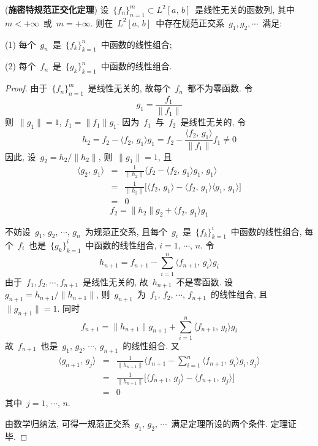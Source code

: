 
\begin{Theorem}(\textbf{施密特规范正交化定理})
设~$\{f_{n}\}_{n=1}^{m}\subset L^2[a,\,b]$~是线性无关的函数列, 其中~$m<+\infty$~或~$m=+\infty$.
则在~$L^2[a,\,b]$~中存在规范正交系~$g_{1}, g_{2}, \cdots$~满足:


(1) 每个~$g_{n}$~是~$\{f_{k}\}_{k=1}^{n}$~中函数的线性组合;

(2)  每个~$f_{n}$~是~$\{g_{k}\}_{k=1}^{n}$~中函数的线性组合.
\end{Theorem}

\begin{proof}
由于~$\{f_{n}\}_{n=1}^{m}$~是线性无关的, 故每个~$f_{n}$~都不为零函数. 令
\[
g_{1}=\frac{f_{1}}{\|f_{1}\|}
\]
则~$\|g_{1}\|=1$, $f_{1}=\|f_{1}\|g_{1}$. 因为~$f_{1}$~与~$f_{2}$~是线性无关的, 令
\[
h_{2}=f_{2}-\langle f_{2},\,g_{1}\rangle g_{1}=f_{2}-\frac{\langle f_{2},\,g_{1}\rangle}{\|f_{1}\|}f_{1}\neq 0
\]
因此, 设~$g_{2}=h_{2}/\|h_{2}\|$, 则~$\|g_{1}\|=1$, 且
\begin{eqnarray*}
\langle g_{2},\,g_{1}\rangle &=& \frac{1}{\|h_{2}\|}\big\langle f_{2}-\langle f_{2},\,g_{1}\rangle g_{1},\,g_{1} \big\rangle\\
&=& \frac{1}{\|h_{2}\|}\big[\langle f_{2},\,g_{1}\rangle-\langle f_{2},\,g_{1}\rangle \langle g_{1},\,g_{1}\rangle\big]\\
&=& 0
\end{eqnarray*}
\[
f_{2}=\|h_{2}\|g_{2}+\langle f_{2},\,g_{1}\rangle g_{1}
\]

不妨设~$g_{1},\, g_{2},\, \cdots,\, g_{n}$~为规范正交系, 且每个~$g_{i}$~是~$\{f_{k}\}_{k=1}^{i}$~中函数的线性组合, 每个~$f_{i}$~也是~$\{g_{k}\}_{k=1}^{i}$~中函数的线性组合, $i=1,\,\cdots,\,n$. 令
\[
h_{n+1}=f_{n+1}-\sum_{i=1}^{n}\langle f_{n+1},\,g_{i}\rangle g_{i}
\]
由于~$f_{1}, f_{2}, \cdots, f_{n+1}$~是线性无关的, 故~$h_{n+1}$~不是零函数. 设~$g_{n+1}=h_{n+1}/\|h_{n+1}\|$, 则~$g_{n+1}$~为~$f_{1},\, f_{2},\,\cdots,\, f_{n+1}$~的线性组合, 且~$\|g_{n+1}\|=1$. 同时
\[
f_{n+1}=\|h_{n+1}\|g_{n+1}+\sum_{i=1}^{n} \langle f_{n+1},\,g_{i}\rangle g_{i}
\]
故~$f_{n+1}$~也是~$g_{1},\, g_{2},\, \cdots,\, g_{n+1}$~的线性组合. 又
\begin{eqnarray*}
\langle g_{n+1},\,g_{j}\rangle &=& \frac{1}{\|h_{n+1}\|}\Big\langle f_{n+1}-\sum_{i=1}^{n}\langle f_{n+1},\,g_{i}\rangle g_{i},g_{j} \Big\rangle \\
&=& \frac{1}{\|h_{n+1}\|}\big[\langle f_{n+1},\,g_{j}\rangle-\langle f_{n+1},\,g_{j}\rangle\big]\\
&=& 0
\end{eqnarray*}
其中~$j=1,\,\cdots,\,n$.

由数学归纳法, 可得一规范正交系~$g_{1},\, g_{2},\, \cdots$~满足定理所设的两个条件. 定理证毕.
\end{proof}

